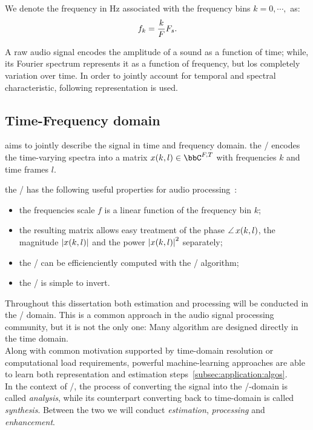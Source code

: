 We denote the frequency in $\si{\Hz}$ associated with the frequency bins $k = 0, \cdots, $ as:
\begin{equation}
    f_k = \frac{k}{F}F_s.
\end{equation}

A raw audio signal encodes the amplitude of a sound as a function of time; while, its Fourier spectrum
represents it as a function of frequency, but los completely variation over time.
In order to jointly account for temporal and spectral characteristic, following representation is used.

\subsection{Time-Frequency domain}
 aims to jointly describe the signal in time and frequency domain.
the \STFTdef/ encodes the time-varying spectra into a matrix $x(k,l) \in \bbC^{F,T}$ with frequencies $k$ and time frames $l$.

the \STFT/ has the following useful properties for audio processing~\cite{vincent2018audio}:
\begin{itemize}
    \item the frequencies scale $f$ is a linear function of the frequency bin $k$;
    \item the resulting matrix allows easy treatment of
          the phase $\operatorname*{\angle}{x(k,l)}$, the magnitude $\magnitudeOf{x(k,l)}$ and the power $\powerOf{x(k,l)}$ separately;
    \item the \DFT/ can be efficienciently computed with the \FFT/ algorithm;
    \item the \STFT/ is simple to invert.
\end{itemize}

Throughout this dissertation both estimation and processing will be conducted in the  \TF/ domain.
This is a common approach in the audio signal processing community, but it is not the only one:
Many algorithm are designed directly in the time domain.
\\Along with common motivation supported by time-domain resolution or computational load requirements,
powerful machine-learning approaches are able to learn both representation and estimation steps~\cref{subsec:application:algos}.
\\In the context of \STFT/, the process of converting the signal into the \TF/-domain is called \textit{analysis}, while
its counterpart converting back to time-domain is called \textit{synthesis}.
Between the two we will conduct \textit{estimation}, \textit{processing} and \textit{enhancement}.



